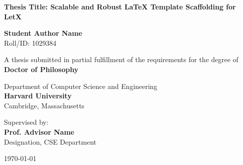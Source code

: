 \begin{titlepage}
\begin{center}
    \vspace*{1cm}
    
    
    \vspace{1.5cm}
    
    {\huge \bfseries \color{primary} Thesis Title: Scalable and Robust LaTeX Template Scaffolding for LetX}
    
    \vspace{1.5cm}
    
    {\Large \bfseries Student Author Name} \\
    \vspace{0.2cm}
    {Roll/ID: 1029384}
    
    \vspace{1.5cm}
    
    {A thesis submitted in partial fulfillment of the requirements for the degree of} \\
    \vspace{0.3cm}
    {\large \bfseries \color{secondary} Doctor of Philosophy}
    
    \vspace{1.5cm}
    
    {Department of Computer Science and Engineering} \\
    \vspace{0.2cm}
    {\large \bfseries \color{primary} Harvard University} \\
    \vspace{0.1cm}
    {Cambridge, Massachusetts}
    
    \vfill
    
    {Supervised by:} \\
    {\large \bfseries Prof. Advisor Name} \\
    {Designation, CSE Department}
    
    \vspace{1cm}
    
    {\large \today}
    
\end{center}
\end{titlepage}

